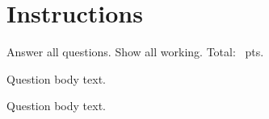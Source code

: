 \documentclass[11pt,a4paper,final]{article}
\begin{document}
\maketitle

\section*{Instructions}

Answer all questions. Show all working. Total: \showtotal~pts.


\begin{questions}
    Question body text.


    Question body text.
\end{questions}
\end{document}
